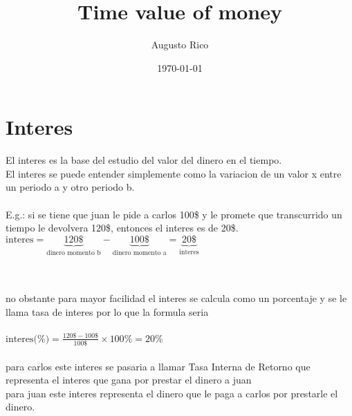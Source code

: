 \documentclass{article}
\title{Time value of money}
\author{Augusto Rico}
\date{\today}
\begin{document}
\maketitle
\section{Interes}

\begin{flushleft}
El interes es la base del estudio del valor del dinero en el tiempo.\\
El interes se puede entender simplemente como la variacion de un valor x entre un periodo a y otro periodo b.
~\\
~\\
E.g.:
si se tiene que juan le pide a carlos 100\$ y le promete que transcurrido un tiempo le devolvera 120\$,
entonces el interes es de 20\$.\\

$\text{interes} = \underbrace{120\$}_{\text{dinero momento b}}-\underbrace{100\$}_{\text{dinero momento a}}= \underbrace{20\$}_{\text{interes}}$

~\\
~\\

no obstante para mayor facilidad el interes se calcula como un porcentaje y se le llama tasa de interes por lo que la formula seria
\\~\\
$ \text{interes(\%)}=\frac{120\$-100\$}{100\$}\times 100\%=20\%$\\

~\\
para carlos este interes se pasaria a llamar Tasa Interna de Retorno que representa el interes que gana por prestar el dinero a juan\\
para juan este interes representa el dinero que le paga a carlos por prestarle el dinero.
\end{flushleft}
\end{document}
